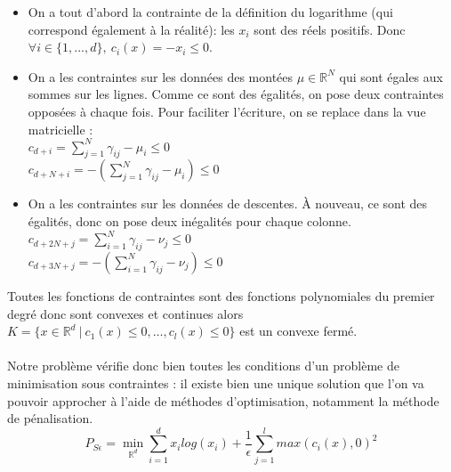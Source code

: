 \documentclass[12pt]{article}
\newcommand{\R}{\mathbb{R}}
\newcommand{\Rd}{\mathbb{R}^d}
\begin{document}
\begin{itemize}
    \item On a tout d'abord la contrainte de la définition du logarithme (qui correspond également à la réalité): les $x_i$ sont des réels positifs. Donc $\forall i \in \{1,...,d\},\:c_i(x) = -x_i \leq 0$.\\
    \item On a les contraintes sur les données des montées $\mu \in \R^N$ qui sont égales aux sommes sur les lignes. Comme ce sont des égalités, on pose deux contraintes opposées à chaque fois. Pour faciliter l'écriture, on se replace dans la vue matricielle :\\
    $c_{d+i} = \sum^{N}_{j=1} \gamma_{ij} -\mu_i \leq 0$\\
    $c_{d+N+i} = -(\sum^{N}_{j=1} \gamma_{ij} -\mu_i) \leq 0$\\
    \item On a les contraintes sur les données de descentes. À nouveau, ce sont des égalités, donc on pose deux inégalités pour chaque colonne.\\
    $c_{d+2N+j} = \sum^{N}_{i=1} \gamma_{ij} -\nu_j \leq 0$\\
    $c_{d+3N+j} = -(\sum^{N}_{i=1} \gamma_{ij} -\nu_j) \leq 0$\\
\end{itemize}
Toutes les fonctions de contraintes sont des fonctions polynomiales du premier degré donc sont convexes et continues alors $K = \{x \in \Rd \:|\: c_1(x) \leq 0, \dots, c_l(x) \leq 0 \}$ est un convexe fermé.\\
\\
Notre problème vérifie donc bien toutes les conditions d'un problème de minimisation sous contraintes : il existe bien une unique solution que l'on va pouvoir approcher à l'aide de méthodes d'optimisation, notamment la méthode de pénalisation.
\[P_{S\epsilon} = \min_{\R^d} \sum^d_{i=1} x_ilog(x_i) + \frac{1}{\epsilon} \sum^{l}_{j = 1}max(c_i(x),0)^2 \]
\end{document}
